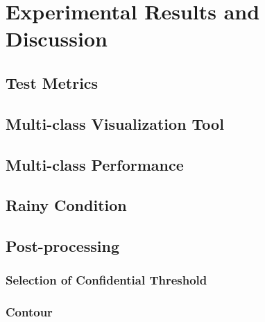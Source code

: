 
\chapter{Experimental Results and Discussion}
\label{cha:experiments}
\begin{spacing}{1.5}
\setlength{\parskip}{0.3in}

\section{Test Metrics}

\section{Multi-class Visualization Tool}

\section{Multi-class Performance}

\section{Rainy Condition}

\section{Post-processing}

\subsection{Selection of Confidential Threshold}

\subsection{Contour}


\end{spacing}
\newpage
